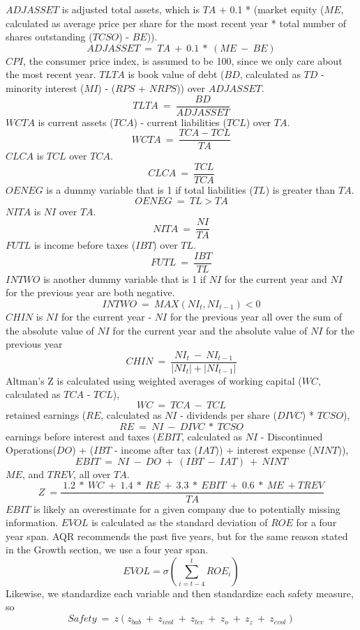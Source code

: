 \documentclass[12pt]{article}
\begin{document}
$ADJASSET$ is adjusted total assets, which is $TA$ + 0.1 * (market equity ($ME$, calculated as average price per share for the most recent year * total number of shares outstanding ($TCSO$) - $BE$)). $$ADJASSET \ = \ TA \ + \ 0.1 \ * \ (ME \ - \ BE)$$ $CPI$, the consumer price index, is assumed to be 100, since we only care about the most recent year. $TLTA$ is book value of debt ($BD$, calculated as $TD$ - minority interest ($MI$) - ($RPS$ + $NRPS$)) over $ADJASSET$. $$TLTA \ = \ \frac{BD}{ADJASSET}$$ $WCTA$ is current assets ($TCA$) - current liabilities ($TCL$) over $TA$. $$WCTA \ = \ \frac{TCA - TCL}{TA}$$ $CLCA$ is $TCL$ over $TCA$. $$ CLCA \ = \ \frac{TCL}{TCA}$$ $OENEG$ is a dummy variable that is 1 if total liabilities ($TL$) is greater than $TA$. $$ OENEG \ = \ TL > TA $$ $NITA$ is $NI$ over $TA$. $$NITA \ = \ \frac{NI}{TA}$$ $FUTL$ is income before taxes ($IBT$) over $TL$. $$FUTL \ = \ \frac{IBT}{TL}$$ $INTWO$ is another dummy variable that is 1 if $NI$ for the current year and $NI$ for the previous year are both negative. $$INTWO \ = \ MAX(NI_t,NI_{t-1}) < 0$$ $CHIN$ is $NI$ for the current year - $NI$ for the previous year all over the sum of the absolute value of $NI$ for the current year and the absolute value of $NI$ for the previous year $$CHIN \ = \ \frac{NI_t \ - \ NI_{t-1}}{|NI_t| + |NI_{t-1}|}$$ Altman's Z is calculated using weighted averages of working capital ($WC$, calculated as $TCA$ - $TCL$), $$WC \ = \ TCA \ - \ TCL$$ retained earnings ($RE$, calculated as $NI$ - dividends per share ($DIVC$) * $TCSO$), $$RE \ = \ NI \ - \ DIVC \ * \ TCSO$$ earnings before interest and taxes ($EBIT$, calculated as $NI$ - Discontinued Operations($DO$) + ($IBT$ - income after tax ($IAT$)) + interest expense ($NINT$)), $$ EBIT \ = \ NI \ - \ DO \ + \ (IBT \ - \ IAT) \ + \ NINT $$ $ME$, and $TREV$, all over $TA$. $$Z \ = \frac{\ 1.2 \ * \ WC \ + \ 1.4 \ * \ RE \ + \ 3.3 \ * \ EBIT \ + \ 0.6 \ * \ ME \ + TREV}{TA}$$ $EBIT$ is likely an overestimate for a given company due to potentially missing information. $EVOL$ is calculated as the standard deviation of $ROE$ for a four year span. AQR recommends the past five years, but for the same reason stated in the Growth section, we use a four year span. $$EVOL = \sigma\left(\sum_{i=t-4}^{t}ROE_i\right)$$ Likewise, we standardize each variable and then standardize each safety measure, so $$Safety \ = \ z(z_{bab} \ + \ z_{ivol} \ + \ z_{lev} \ + \ z_{o} \ + \ z_{z} \ + \ z_{evol})$$ 
\end{document}
